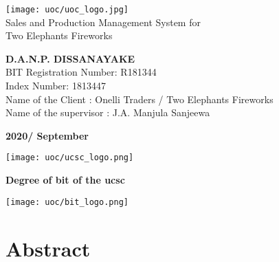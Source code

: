 \documentclass[12pt]{report}
\begin{document}
\onehalfspacing


\setlength{\parindent}{3em} %
\setlength{\parskip}{1em} %


\thispagestyle{empty}
\begin{titlepage}
	\begin{center}
		\vspace*{2cm}
		\texttt{[image: uoc/uoc\_logo.jpg]}\\
		\vspace{1cm}
		{\LARGE Sales and Production Management System for \\Two Elephants Fireworks}
		\vspace{2cm}
		\begin{large}

			\textbf{D.A.N.P. DISSANAYAKE}\\
			\vspace{2cm}
			BIT Registration Number: R181344 \\
			Index Number: 1813447 \\
			Name of the Client :  Onelli Traders / Two Elephants Fireworks \\
			Name of the supervisor :  J.A. Manjula Sanjeewa \\

			\vspace{1cm}

			\bf{2020/ September}

			\vspace{2.5cm}

			\vfill


			\texttt{[image: uoc/ucsc\_logo.png]}%
			\begin{minipage}[b]{0.7\textwidth}
				\centering
				{\small \bf Degree of \acrlong{bit} of the \acrlong{ucsc}}
			\end{minipage}%
			\texttt{[image: uoc/bit\_logo.png]}
		\end{large}
	\end{center}
\end{titlepage}


\newpage
\thispagestyle{plain}
\setcounter{page}{2}
\chapter*{\Huge Abstract}
\end{document}
